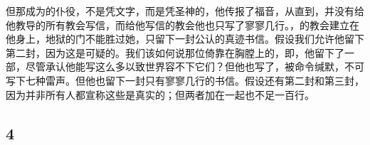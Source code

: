 但那成为的仆役，不是凭文字，而是凭圣神的，他传报了福音，从直到，并没有给他教导的所有教会写信，而给他写信的教会他也只写了寥寥几行。，的教会建立在他身上，地狱的门不能胜过她，只留下一封公认的真迹书信。假设我们允许他留下第二封，因为这是可疑的。我们该如何说那位倚靠在胸膛上的，即，他留下了一部，尽管承认他能写这么多以致世界容不下它们？但他也写了，被命令缄默，不可写下七种雷声。但他也留下一封只有寥寥几行的书信。假设还有第二封和第三封，因为并非所有人都宣称这些是真实的；但两者加在一起也不足一百行。\par

\par


\subsection{4}

